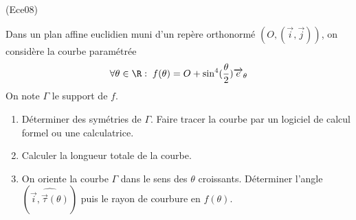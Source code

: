 \begin{tiny}(Ece08)\end{tiny} Dans un plan affine euclidien muni d'un repère orthonormé $(O,(\overrightarrow i, \overrightarrow j))$, on considère la courbe paramétrée
\begin{displaymath}
\forall \theta\in \R:\; f(\theta)= O+\sin^4(\frac{\theta}{2})\overrightarrow{e}_\theta
\end{displaymath}
On note $\Gamma$ le support de $f$.
\begin{enumerate}
 \item Déterminer des symétries de $\Gamma$. Faire tracer la courbe par un logiciel de calcul formel ou une calculatrice.
 \item Calculer la longueur totale de la courbe.
 \item On oriente la courbe $\Gamma$ dans le sens des $\theta$ croissants. Déterminer l'angle $(\widehat{\overrightarrow{i},\overrightarrow{\tau}(\theta)})$ puis le rayon de courbure en $f(\theta)$.
\end{enumerate}
 
